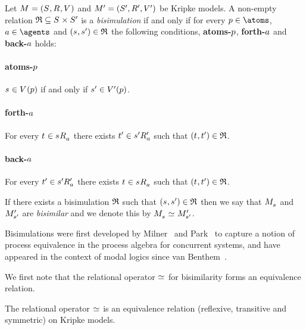 \begin{definition}[Bisimulation]
Let $\kModelAndTuple$ and $\kModelAndTupleP$ be Kripke models.
A non-empty relation $\bisimulation \subseteq \kStates \times \kStatesP$ is a {\em bisimulation} if and only if for every $\atomP \in \atoms$, $\agentA \in \agents$ and $(\kStateS, \kStateSP) \in \bisimulation$ the following conditions, {\bf atoms-$p$}, {\bf forth-$a$} and {\bf back-$a$} holds:

\paragraph{atoms-$p$}
$\kStateS \in \kValuation(\atomP)$ if and only if ${s}^{\prime} \in {V^{\prime}}(p)$.

\paragraph{forth-$a$}
For every $\kStateT \in \kSuccessorsA{\kStateS}$ there exists ${t}^{\prime} \in {{s}^{\prime}} {R^{\prime}_{a}}$ such that $(\kStateT, \kStateTP) \in \bisimulation$.

\paragraph{back-$a$}
For every ${t}^{\prime} \in {{s}^{\prime}} {R^{\prime}_{a}}$ there exists $\kStateT \in \kSuccessorsA{\kStateS}$ such that $(\kStateT, \kStateTP) \in \bisimulation$.

If there exists a bisimulation $\mathfrak{R}$ such that $(\kStateS, \kStateSP) \in \bisimulation$ then we say that $\kPModel{\kStateS}$ and ${M^{\prime}_{{s}^{\prime}}}$ are {\em bisimilar} and we denote this by $\kPModel{\kStateS} \bisimilar \kPModelP{\kStateSP}$.
\end{definition}

Bisimulations were first developed by Milner~\cite{milner:1980} and Park~\cite{park:1981} to capture a notion of process equivalence in the process algebra for concurrent systems, and have appeared in the context of modal logics since van Benthem~\cite{vanbenthem:1984}.

We first note that the relational operator $\bisimilar$ for bisimilarity forms an equivalence relation.

\begin{proposition}\label{bisimulation-equivalence-relation}
The relational operator $\bisimilar$ is an equivalence relation (reflexive, transitive and symmetric) on Kripke models.
\end{proposition}

